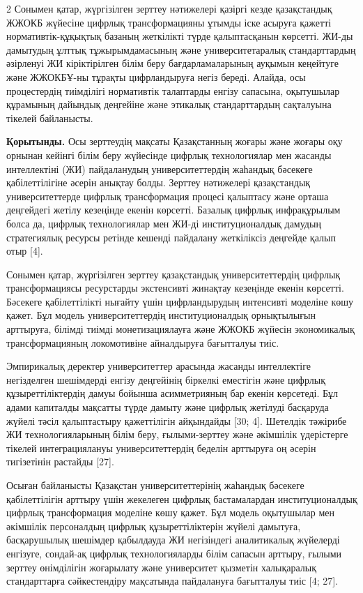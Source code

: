 \begin{multicols}{2}
Сонымен қатар, жүргізілген зерттеу нәтижелері қазіргі кезде қазақстандық
ЖЖОКБ жүйесіне цифрлық трансформацияны ұтымды іске асыруға қажетті
нормативтік-құқықтық базаның жеткілікті түрде қалыптасқанын көрсетті.
ЖИ-ды дамытудың ұлттық тұжырымдамасының және университетаралық
стандарттардың әзірленуі ЖИ кіріктірілген білім беру бағдарламаларының
ауқымын кеңейтуге және ЖЖОКБҰ-ны тұрақты цифрландыруға негіз береді.
Алайда, осы процестердің тиімділігі нормативтік талаптарды енгізу
сапасына, оқытушылар құрамының дайындық деңгейіне және этикалық
стандарттардың сақталуына тікелей байланысты.

{\bfseries Қорытынды.} Осы зерттеудің мақсаты Қазақстанның жоғары және
жоғары оқу орнынан кейінгі білім беру жүйесінде цифрлық технологиялар
мен жасанды интеллектіні (ЖИ) пайдаланудың университеттердің жаһандық
бәсекеге қабілеттілігіне әсерін анықтау болды. Зерттеу нәтижелері
қазақстандық университеттерде цифрлық трансформация процесі қалыптасу
және орташа деңгейдегі жетілу кезеңінде екенін көрсетті. Базалық цифрлық
инфрақұрылым болса да, цифрлық технологиялар мен ЖИ-ді институционалдық
дамудың стратегиялық ресурсы ретінде кешенді пайдалану жеткіліксіз
деңгейде қалып отыр {[}4{]}.

Сонымен қатар, жүргізілген зерттеу қазақстандық университеттердің
цифрлық трансформациясы ресурстарды экстенсивті жинақтау кезеңінде
екенін көрсетті. Бәсекеге қабілеттілікті нығайту үшін цифрландырудың
интенсивті моделіне көшу қажет. Бұл модель университеттердің
институционалдық орнықтылығын арттыруға, білімді тиімді монетизациялауға
және ЖЖОКБ жүйесін экономикалық трансформацияның локомотивіне
айналдыруға бағытталуы тиіс.

Эмпирикалық деректер университеттер арасында жасанды интеллектіге
негізделген шешімдерді енгізу деңгейінің біркелкі еместігін және цифрлық
құзыреттіліктердің дамуы бойынша асимметрияның бар екенін көрсетеді. Бұл
адами капиталды мақсатты түрде дамыту және цифрлық жетілуді басқаруда
жүйелі тәсіл қалыптастыру қажеттілігін айқындайды {[}30; 4{]}. Шетелдік
тәжірибе ЖИ технологияларының білім беру, ғылыми-зерттеу және әкімшілік
үдерістерге тікелей интеграциялануы университеттердің беделін арттыруға
оң әсерін тигізетінін растайды {[}27{]}.

Осыған байланысты Қазақстан университеттерінің жаһандық бәсекеге
қабілеттілігін арттыру үшін жекелеген цифрлық бастамалардан
институционалдық цифрлық трансформация моделіне көшу қажет. Бұл модель
оқытушылар мен әкімшілік персоналдың цифрлық құзыреттіліктерін жүйелі
дамытуға, басқарушылық шешімдер қабылдауда ЖИ негізіндегі аналитикалық
жүйелерді енгізуге, сондай-ақ цифрлық технологияларды білім сапасын
арттыру, ғылыми зерттеу өнімділігін жоғарылату және университет қызметін
халықаралық стандарттарға сәйкестендіру мақсатында пайдалануға
бағытталуы тиіс {[}4; 27{]}.


\end{multicols}

